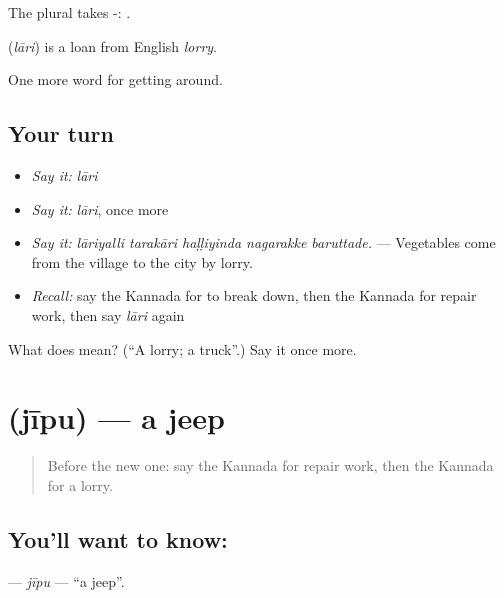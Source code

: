 The plural takes -: .

\begin{cousinweb}
\textbf{} (\emph{lāri}) is a loan from English \emph{lorry}.
\end{cousinweb}

\begin{grammarlens}[title={What you've built}]
One more word for getting around.
\end{grammarlens}

\subsection*{Your turn}
\begin{itemize}
\raggedright
  \item \emph{Say it:} \emph{lāri}
  \item \emph{Say it:} \emph{lāri}, once more
  \item \emph{Say it:} \emph{lāriyalli tarakāri haḷḷiyinda nagarakke baruttade.} — Vegetables come from the village to the city by lorry.
  \item \emph{Recall:} say the Kannada for to break down, then the Kannada for repair work, then say \emph{lāri} again
\end{itemize}

\begin{tcolorbox}[breakable,colback=teal!4,colframe=teal!35!black,title={Before you move on}]
What does  mean? (\textquotedblleft{}A lorry; a truck\textquotedblright{}.) Say it once more.
\end{tcolorbox}
\section[\texorpdfstring{\kn{ಜೀಪು} (jīpu)}{ಜೀಪು (jīpu)}]{ (jīpu) — a jeep}

\label{lesson:KA-C451-jipu}



\begin{quote}
Before the new one: say the Kannada for repair work, then the Kannada for a lorry.
\end{quote}

\subsection*{You'll want to know: }
\textbf{} — \emph{jīpu} — \textquotedblleft{}a jeep\textquotedblright{}.

